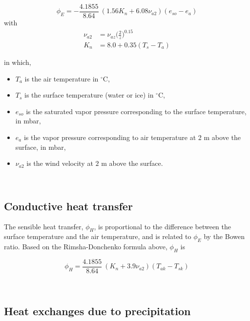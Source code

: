 \begin{equation} \label{eq:phie}
\phi_E = -\frac{4.1855}{8.64}\ ( 1.56K_n+6.08\nu_{a2} ) ( e_{so}-e_a )
\end{equation}
with
\begin{equation}
\begin{aligned}
\nu_{a2} &= \nu_{az} \Big( \frac{2}{z} \Big)^{0.15} \\
K_n &= 8.0+0.35(  T_s-T_a )
\end{aligned}
\end{equation}

in which,
\begin{itemize}
  \item $T_a$ is the air temperature in $^{\circ}$C,
	\item $T_s$ is the surface temperature (water or ice) in $^{\circ}$C,
	\item $e_{so}$ is the saturated vapor pressure corresponding to the surface temperature, in mbar,
	\item $e_a$ is the vapor pressure corresponding to air temperature at 2 m above the surface, in mbar,
	\item $\nu_{a2}$ is the wind velocity at $2$ m above the surface.
\end{itemize}

~\newline
\subsection{Conductive heat transfer}

The sensible heat transfer, $\phi_H$, is proportional to the difference between the surface temperature and the air temperature, and is related to $\phi_E$ by the Bowen ratio. Based on the Rimsha-Donchenko formula above, $\phi_H$ is

\begin{equation} \label{eq:phih}
\phi_H = \frac{4.1855}{8.64}\ ( K_n+3.9\nu_{a2} ) (T_{ak}-T_{sk} )
\end{equation}

~\newline
\subsection{Heat exchanges due to precipitation}

